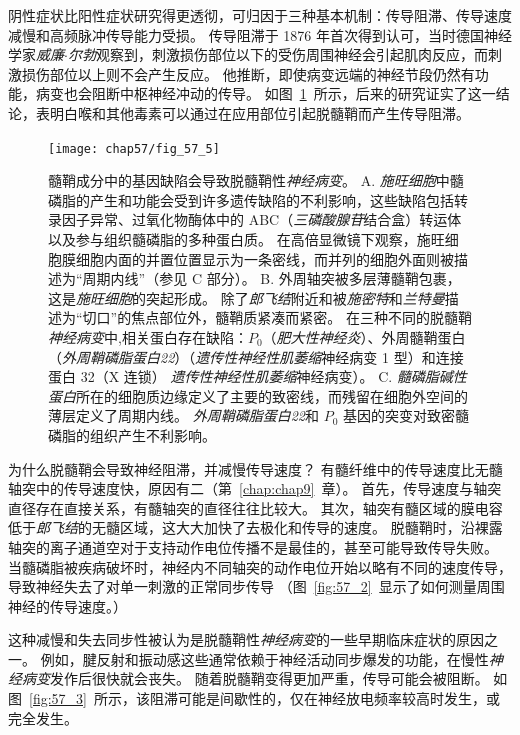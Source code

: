 阴性症状比阳性症状研究得更透彻，可归因于三种基本机制：传导阻滞、传导速度减慢和高频脉冲传导能力受损。
传导阻滞于 1876 年首次得到认可，当时德国神经学家\textit{威廉$\cdot$尔勃}观察到，刺激损伤部位以下的受伤周围神经会引起肌肉反应，而刺激损伤部位以上则不会产生反应。
他推断，即使病变远端的神经节段仍然有功能，病变也会阻断中枢神经冲动的传导。
如图~\ref{fig:57_5}~所示，后来的研究证实了这一结论，表明白喉和其他毒素可以通过在应用部位引起脱髓鞘而产生传导阻滞。


\begin{figure}[htbp]
	\centering
	\texttt{[image: chap57/fig\_57\_5]}
	\caption{髓鞘成分中的基因缺陷会导致脱髓鞘性\textit{神经病变}。
		A. \textit{施旺细胞}中髓磷脂的产生和功能会受到许多遗传缺陷的不利影响，这些缺陷包括转录因子异常、过氧化物酶体中的 ABC（\textit{三磷酸腺苷}结合盒）转运体以及参与组织髓磷脂的多种蛋白质。
		在高倍显微镜下观察，施旺细胞膜细胞内面的并置位置显示为一条密线，而并列的细胞外面则被描述为“周期内线”（参见 C 部分）\cite{lupski1998molecular}。 
		B. 外周轴突被多层薄髓鞘包裹，这是\textit{施旺细胞}的突起形成。
		除了\textit{郎飞结}附近和被\textit{施密特}和\textit{兰特曼}描述为“切口”的焦点部位外，髓鞘质紧凑而紧密。
		在三种不同的脱髓鞘\textit{神经病变}中,相关蛋白存在缺陷：$ P_0 $（\textit{肥大性神经炎}）、外周髓鞘蛋白（\textit{外周鞘磷脂蛋白22}）（\textit{遗传性神经性肌萎缩}神经病变 1 型）和连接蛋白 32（X 连锁） \textit{遗传性神经性肌萎缩}神经病变）\cite{lupski1998molecular}。
		C. \textit{髓磷脂碱性蛋白}所在的细胞质边缘定义了主要的致密线，而残留在细胞外空间的薄层定义了周期内线。
		\textit{外周鞘磷脂蛋白22}和 $P_0$ 基因的突变对致密髓磷脂的组织产生不利影响\cite{brown2002inherited}。}
	\label{fig:57_5}
\end{figure}


为什么脱髓鞘会导致神经阻滞，并减慢传导速度？
有髓纤维中的传导速度比无髓轴突中的传导速度快，原因有二（第~\ref{chap:chap9}~章）。
首先，传导速度与轴突直径存在直接关系，有髓轴突的直径往往比较大。
其次，轴突有髓区域的膜电容低于\textit{郎飞结}的无髓区域，这大大加快了去极化和传导的速度。
脱髓鞘时，沿裸露轴突的离子通道空对于支持动作电位传播不是最佳的，甚至可能导致传导失败。
当髓磷脂被疾病破坏时，神经内不同轴突的动作电位开始以略有不同的速度传导，导致神经失去了对单一刺激的正常同步传导
（图~\ref{fig:57_2}~显示了如何测量周围神经的传导速度。）


这种减慢和失去同步性被认为是脱髓鞘性\textit{神经病变}的一些早期临床症状的原因之一。
例如，腱反射和振动感这些通常依赖于神经活动同步爆发的功能，在慢性\textit{神经病变}发作后很快就会丧失。
随着脱髓鞘变得更加严重，传导可能会被阻断。
如图~\ref{fig:57_3}~所示，该阻滞可能是间歇性的，仅在神经放电频率较高时发生，或完全发生。



